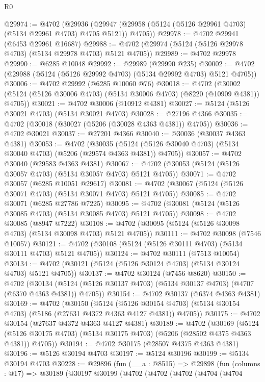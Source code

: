 \begin{lexlean}{R0}
\begin{coremodule}
@29974 := @4702
    (@29936 (@29947 (@29958 (@5124 (@5126 @29961 @4703) (@5134 @29961 @4703) @4705 @5121)) @4705))
@29978 := @4702 @29941 (@6453 @29961 @16687)
@29988 := @4702 (@29974 (@5124 (@5126 @29978 @4703) (@5134 @29978 @4703) @5121 @4705))
@29989 := @4702 @29978
@29990 := @6285 @10048
@29992 := @29989 (@29990 @235)
@30002 := @4702 (@29988 (@5124 (@5126 @29992 @4703) (@5134 @29992 @4703) @5121 @4705))
@30006 := @4702 @29992 (@6285 @10060 @76)
@30018 := @4702
    (@30002 (@5124 (@5126 @30006 @4703) (@5134 @30006 @4703) (@8220 (@10909 @4381)) @4705))
@30021 := @4702 @30006 (@10912 @4381)
@30027 := @5124 (@5126 @30021 @4703) (@5134 @30021 @4703)
@30028 := @27196 @4366
@30035 := @4702 (@30018 (@30027 (@5206 (@30028 @4363 @4381)) @4705))
@30036 := @4702 @30021
@30037 := @27201 @4366
@30040 := @30036 (@30037 @4363 @4381)
@30053 := @4702
    (@30035 (@5124 (@5126 @30040 @4703) (@5134 @30040 @4703) (@5206 (@29574 @4363 @4381)) @4705))
@30057 := @4702 @30040 (@29583 @4363 @4381)
@30067 := @4702 (@30053 (@5124 (@5126 @30057 @4703) (@5134 @30057 @4703) @5121 @4705))
@30071 := @4702 @30057 (@6285 @10051 @29617)
@30081 := @4702 (@30067 (@5124 (@5126 @30071 @4703) (@5134 @30071 @4703) @5121 @4705))
@30085 := @4702 @30071 (@6285 @27786 @7225)
@30095 := @4702 (@30081 (@5124 (@5126 @30085 @4703) (@5134 @30085 @4703) @5121 @4705))
@30098 := @4702 @30085 (@8947 @7222)
@30108 := @4702 (@30095 (@5124 (@5126 @30098 @4703) (@5134 @30098 @4703) @5121 @4705))
@30111 := @4702 @30098 (@7546 @10057)
@30121 := @4702 (@30108 (@5124 (@5126 @30111 @4703) (@5134 @30111 @4703) @5121 @4705))
@30124 := @4702 @30111 (@7513 @10054)
@30134 := @4702 (@30121 (@5124 (@5126 @30124 @4703) (@5134 @30124 @4703) @5121 @4705))
@30137 := @4702 @30124 (@7456 @8620)
@30150 := @4702
    (@30134 (@5124 (@5126 @30137 @4703) (@5134 @30137 @4703) (@4707 (@6370 @4363 @4381)) @4705))
@30154 := @4702 @30137 (@6374 @4363 @4381)
@30169 := @4702
    (@30150
      (@5124
        (@5126 @30154 @4703)
        (@5134 @30154 @4703)
        (@5186 (@27631 @4372 @4363 @4127 @4381))
        @4705))
@30175 := @4702 @30154 (@27637 @4372 @4363 @4127 @4381)
@30189 := @4702
    (@30169
      (@5124 (@5126 @30175 @4703) (@5134 @30175 @4703) (@5206 (@28502 @4375 @4363 @4381)) @4705))
@30194 := @4702 @30175 (@28507 @4375 @4363 @4381)
@30196 := @5126 @30194 @4703
@30197 := @5124 @30196
@30199 := @5134 @30194 @4703
@30228 := @29896
    (fun (__a : @8515) =>
    @29898
      (fun (columns : @17) =>
      @30189
        (@30197
          @30199
          (@4702
            (@4702
              (@4702
                (@4704
                  (@4704

\end{coremodule}
\end{lexlean}
